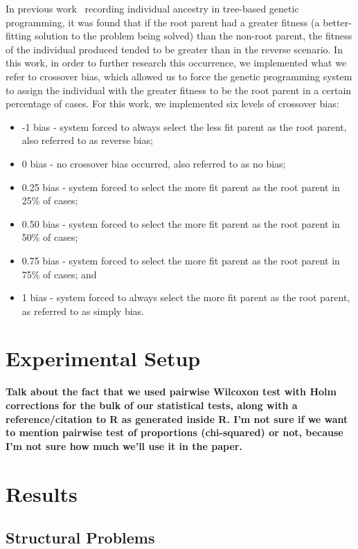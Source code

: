 \documentclass{sig-alternate}
\begin{document}
In previous work~\cite{McPheeDonatucciDramdahl:2014} recording individual ancestry in tree-based genetic programming,
it was found that if the root parent had a greater fitness (a better-fitting solution to the problem being solved) than
the non-root parent, the fitness of the individual produced tended to be greater than in the reverse scenario. In this
work, in order to further research this occurrence, we implemented what we refer to crossover bias, which allowed us to
force the genetic programming system to assign the individual with the greater fitness to be the root parent in a
certain percentage of cases. For this work, we implemented six levels of crossover bias:
\begin{itemize}
\item -1 bias - system forced to always select the less fit parent as the root parent, also referred to as reverse bias;
\item 0 bias - no crossover bias occurred, also referred to as no bias;
\item 0.25 bias - system forced to select the more fit parent as the root parent in 25\% of cases;
\item 0.50 bias - system forced to select the more fit parent as the root parent in 50\% of cases;
\item 0.75 bias - system forced to select the more fit parent as the root parent in 75\% of cases; and
\item 1 bias - system forced to always select the more fit parent as the root parent, as referred to as simply bias.
\end{itemize}

\section{Experimental Setup} \label{sec:Experiments}

\textbf{Talk about the fact that we used pairwise Wilcoxon test with Holm corrections for the bulk of our statistical 
tests, along with a reference/citation to R as generated inside R. I'm not sure if we want to mention pairwise test of 
proportions (chi-squared) or not, because I'm not sure how much we'll use it in the paper.}

\section{Results} \label{sec:Results}

\subsection{Structural Problems}
\end{document}
